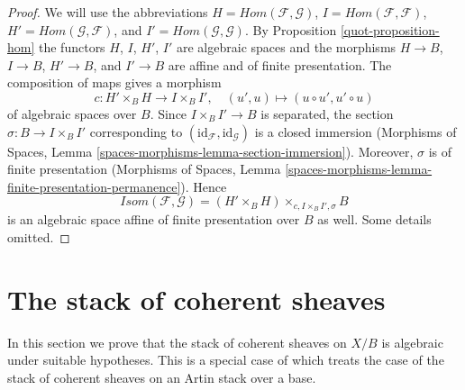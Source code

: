 \begin{proof}

We will use the abbreviations
$H = \mathit{Hom}(\mathcal{F}, \mathcal{G})$,
$I = \mathit{Hom}(\mathcal{F}, \mathcal{F})$,
$H' = \mathit{Hom}(\mathcal{G}, \mathcal{F})$, and
$I' = \mathit{Hom}(\mathcal{G}, \mathcal{G})$.
By Proposition \ref{quot-proposition-hom} the functors
$H$, $I$, $H'$, $I'$ are algebraic spaces and the morphisms
$H \to B$, $I \to B$, $H' \to B$, and $I' \to B$
are affine and of finite presentation.
The composition of maps gives a morphism
$$
c : H' \times_B H \longrightarrow I \times_B I',\quad
(u', u) \longmapsto (u \circ u', u' \circ u)
$$
of algebraic spaces over $B$. Since $I \times_B I' \to B$ is separated,
the section $\sigma : B \to I \times_B I'$ corresponding to
$(\text{id}_\mathcal{F}, \text{id}_\mathcal{G})$
is a closed immersion
(Morphisms of Spaces, Lemma \ref{spaces-morphisms-lemma-section-immersion}).
Moreover, $\sigma$ is of finite presentation
(Morphisms of Spaces, Lemma
\ref{spaces-morphisms-lemma-finite-presentation-permanence}).
Hence
$$
\mathit{Isom}(\mathcal{F}, \mathcal{G}) =
(H' \times_B H) \times_{c, I \times_B I', \sigma} B
$$
is an algebraic space affine of finite presentation over $B$ as well.
Some details omitted.
\end{proof}

\section{The stack of coherent sheaves}
\label{quot-section-stack-coherent-sheaves}
In this section we prove that the stack of coherent sheaves
on $X/B$ is algebraic under suitable hypotheses. This is a
special case of \cite[Theorem 2.1.1]{lieblich_remarks}
which treats the case of the stack of coherent sheaves on an
Artin stack over a base.

